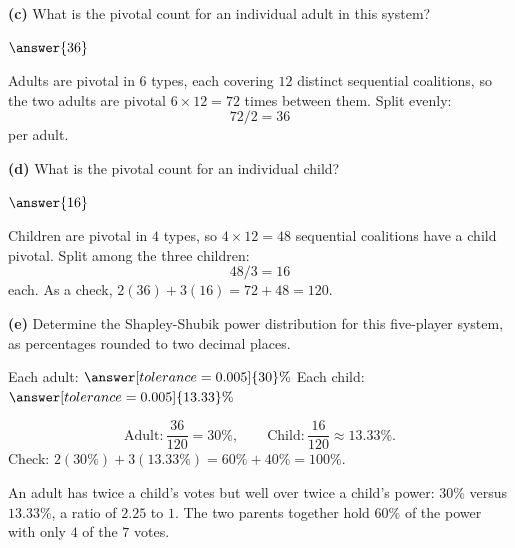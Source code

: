 \documentclass[12pt]{ximera}
\begin{document}
\begin{problem}
\begin{prompt}
\textbf{(c)} What is the pivotal count for an individual adult in this system?

$\answer{36}$

\begin{feedback}
Adults are pivotal in $6$ types, each covering $12$ distinct sequential coalitions,
so the two adults are pivotal $6\times 12 = 72$ times between them. Split evenly:
\[ 72 / 2 = 36 \]
per adult.
\end{feedback}
\end{prompt}

\begin{prompt}
\textbf{(d)} What is the pivotal count for an individual child?

$\answer{16}$

\begin{feedback}
Children are pivotal in $4$ types, so $4\times 12 = 48$ sequential coalitions have a
child pivotal. Split among the three children:
\[ 48/3 = 16 \]
each. As a check, $2(36) + 3(16) = 72 + 48 = 120$. \checkmark
\end{feedback}
\end{prompt}

\begin{prompt}
\textbf{(e)} Determine the Shapley-Shubik power distribution for this five-player
system, as percentages rounded to two decimal places.

Each adult: $\answer[tolerance=0.005]{30}\%$ \qquad
Each child: $\answer[tolerance=0.005]{13.33}\%$

\begin{feedback}
\[
\text{Adult}: \frac{36}{120}=30\%, \qquad \text{Child}: \frac{16}{120}\approx 13.33\%.
\]
Check: $2(30\%) + 3(13.33\%) = 60\% + 40\% = 100\%$. \checkmark

An adult has twice a child's votes but well over twice a child's power: $30\%$ versus
$13.33\%$, a ratio of $2.25$ to $1$. The two parents together hold $60\%$ of the
power with only $4$ of the $7$ votes.
\end{feedback}
\end{prompt}
\end{problem}
\end{document}
